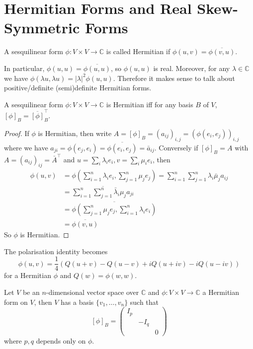 \section{Hermitian Forms and Real Skew-Symmetric Forms}
\begin{definition}
    A sesquilinear form $\phi:V\times V\to\mathbb C$  is called Hermitian if $\phi(u,v)=\overline{\phi(v,u)}$.
\end{definition}
\begin{remark}
    In particular, $\phi(u,u)=\overline{\phi(u,u)}$, so $\phi(u,u)$ is real.
    Moreover, for any $\lambda\in\mathbb C$ we have $\phi(\lambda u,\lambda u)=|\lambda|^2\phi(u,u)$.
    Therefore it makes sense to talk about positive/definite (semi)definite Hermitian forms.
\end{remark}
\begin{lemma}
    A sesquilinear form $\phi:V\times V\to\mathbb C$ is Hermitian iff for any basis $B$ of $V$, $[\phi]_B=\overline{[\phi]}_B^\top$.
\end{lemma}
\begin{proof}
    If $\phi$ is Hermitian, then write $A=[\phi]_B=(a_{ij})_{i,j}=(\phi(e_i,e_j))_{i,j}$ where we have $a_{ji}=\phi(e_j,e_i)=\overline{\phi(e_i,e_j)}=\bar{a}_{ij}$.
    Conversely if $[\phi]_B=A$ with $A=(a_{ij})_{ij}=\bar{A}^\top$ and $u=\sum_i\lambda_ie_i,v=\sum_i\mu_ie_i$, then
    \begin{align*}
        \phi(u,v)&=\phi\left( \sum_{i=1}^n\lambda_ie_i,\sum_{j=1}^n\mu_je_j \right)=\sum_{i=1}^n\sum_{j=1}^n\lambda_i\bar\mu_ja_{ij}\\
        &=\overline{\sum_{i=1}^n\sum_{j=1}^n\bar\lambda_i\mu_ja_{ji}}\\
        &=\overline{\phi\left( \sum_{j=1}^n\mu_je_j,\sum_{i=1}^n\lambda_ie_i \right)}\\
        &=\overline{\phi(v,u)}
    \end{align*}
    So $\phi$ is Hermitian.
\end{proof}
The polarisation identity becomes
$$\phi(u,v)=\frac{1}{4}(Q(u+v)-Q(u-v)+iQ(u+iv)-iQ(u-iv))$$
for a Hermitian $\phi$ and $Q(w)=\phi(w,w)$.
\begin{theorem}
    Let $V$ be an $n$-dimensional vector space over $\mathbb C$ and $\phi:V\times V\to\mathbb C$ a Hermitian form on $V$, then $V$ has a basis $\{v_1,\ldots,v_n\}$ such that
    $$[\phi]_B=\begin{pmatrix}
        I_p&&\\
        &-I_q&\\
        &&0
    \end{pmatrix}$$
    where $p,q$ depends only on $\phi$.
\end{theorem}
